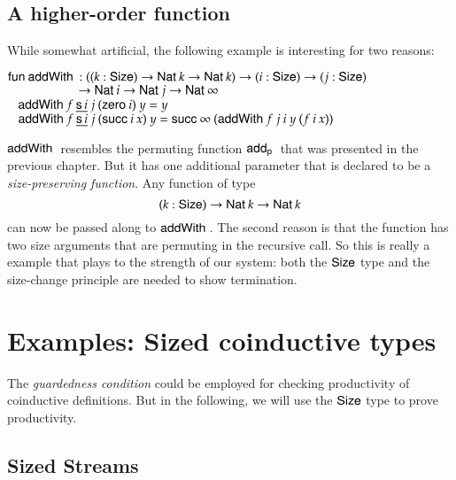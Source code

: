 \subsection{A higher-order function}
While somewhat artificial, the following example is interesting for two reasons:
\begin{bsp}
$\mathsf{fun}\: \mathsf{addWith}\: : ((k : \mathsf{Size} ) \rightarrow \mathsf{Nat}\: k \rightarrow \mathsf{Nat}\: k ) \rightarrow (i : \mathsf{Size} ) \rightarrow (j : \mathsf{Size} ) $\\
$\spcx \spcx \ra  \SNat i \ra \SNat j \ra \SNat \infty $\\
$\hspace*{3mm} \mathsf{addWith}\: f \: \underline{\mathsf{s}\, i} \: j \: (\mathsf{zero}\: i) \: y = y $ \\
$\hspace*{3mm} \mathsf{addWith}\: f \: \underline{\mathsf{s}\, i} \: j \: (\mathsf{succ}\: i \: x) \: y = \mathsf{succ}\: \infty \: (\mathsf{addWith}\: f \: j \: i \: y \: (f \: i \: x))$
\end{bsp}
$\mathsf{addWith}\:$ resembles the permuting function $\mathsf{add_p}\:$ that was presented in the previous chapter.
But it has one additional parameter that is declared to be a \emph{size-preserving function}. 
Any function of type 
\[ (k : \mathsf{Size} ) \rightarrow \mathsf{Nat}\: k \rightarrow \mathsf{Nat}\: k \]
can now be passed along to $\mathsf{addWith}\:$.
The second reason is that the function has two size arguments that are permuting in the recursive call. 
So this is really a example that plays to the strength of our system: both the $\mathsf{Size}$ type and the size-change principle are needed to show termination.

\section{Examples: Sized coinductive types}

The \emph{guardedness condition} \cite{coquand-infinite} could be employed for checking productivity of coinductive definitions. But in the following, we will use the $\mathsf{Size}$ type to prove productivity.

\subsection{Sized Streams}

